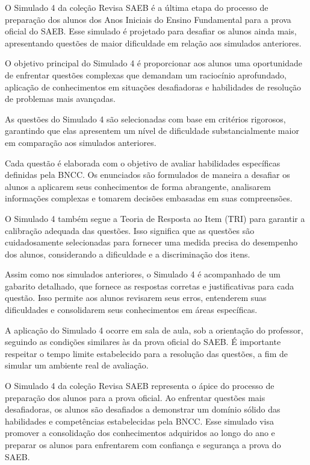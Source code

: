 O Simulado 4 da coleção Revisa SAEB é a última etapa do processo de preparação dos
alunos dos Anos Iniciais do Ensino Fundamental para a prova oficial do
SAEB. Esse simulado é projetado para desafiar os alunos ainda mais,
apresentando questões de maior dificuldade em relação aos simulados
anteriores.

O objetivo principal do Simulado 4 é proporcionar aos alunos uma
oportunidade de enfrentar questões complexas que demandam um raciocínio
aprofundado, aplicação de conhecimentos em situações desafiadoras e
habilidades de resolução de problemas mais avançadas.

As questões do Simulado 4 são selecionadas com base em critérios
rigorosos, garantindo que elas apresentem um nível de dificuldade
substancialmente maior em comparação aos simulados anteriores.

Cada questão é elaborada com o objetivo de avaliar habilidades
específicas definidas pela BNCC. Os enunciados são formulados de maneira
a desafiar os alunos a aplicarem seus conhecimentos de forma abrangente,
analisarem informações complexas e tomarem decisões embasadas em suas
compreensões.

O Simulado 4 também segue a Teoria de Resposta ao Item (TRI) para
garantir a calibração adequada das questões. Isso significa que as
questões são cuidadosamente selecionadas para fornecer uma medida
precisa do desempenho dos alunos, considerando a dificuldade e a
discriminação dos itens.

Assim como nos simulados anteriores, o Simulado 4 é acompanhado de um
gabarito detalhado, que fornece as respostas corretas e justificativas
para cada questão. Isso permite aos alunos revisarem seus erros,
entenderem suas dificuldades e consolidarem seus conhecimentos em áreas
específicas.

A aplicação do Simulado 4 ocorre em sala de aula, sob a orientação do
professor, seguindo as condições similares às da prova oficial do SAEB.
É importante respeitar o tempo limite estabelecido para a resolução das
questões, a fim de simular um ambiente real de avaliação.

O Simulado 4 da coleção Revisa SAEB representa o ápice do processo de preparação dos
alunos para a prova oficial. Ao enfrentar questões mais desafiadoras, os
alunos são desafiados a demonstrar um domínio sólido das habilidades e
competências estabelecidas pela BNCC. Esse simulado visa promover a
consolidação dos conhecimentos adquiridos ao longo do ano e preparar os
alunos para enfrentarem com confiança e segurança a prova do SAEB.
